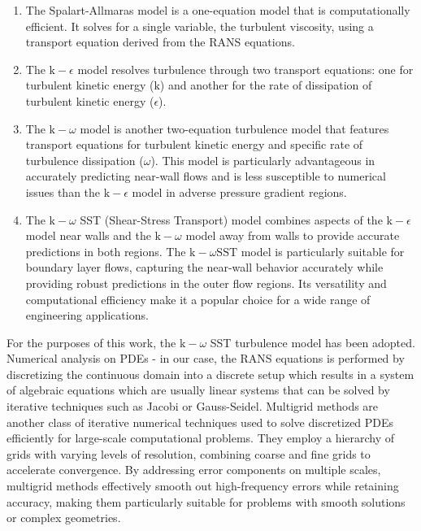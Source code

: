 \begin{enumerate}
  \item The Spalart-Allmaras model is a one-equation model that is computationally efficient. It solves for a single variable, the turbulent viscosity, using a transport equation derived from the RANS equations. 
  \item The $\text{k}-\epsilon$ model resolves turbulence through two transport equations: one for turbulent kinetic energy ($\text{k}$) and another for the rate of dissipation of turbulent kinetic energy ($\epsilon$). 
  \item The $\text{k}-\omega$ model is another two-equation turbulence model that features transport equations for turbulent kinetic energy and specific rate of turbulence dissipation ($\omega$). This model is particularly advantageous in accurately predicting near-wall flows and is less susceptible to numerical issues than the $\text{k}-\epsilon$ model in adverse pressure gradient regions. 
  \item The $\text{k}-\omega $  SST (Shear-Stress Transport) model combines aspects of the $\text{k}-\epsilon$ model near walls and the $\text{k}-\omega$ model away from walls to provide accurate predictions in both regions. The $\text{k}-\omega \text{SST}$ model is particularly suitable for boundary layer flows, capturing the near-wall behavior accurately while providing robust predictions in the outer flow regions. Its versatility and computational efficiency make it a popular choice for a wide range of engineering applications.
\end{enumerate}
For the purposes of this work, the $\text{k}-\omega$ SST turbulence model has been adopted.\\
Numerical analysis on PDEs - in our case, the RANS equations is performed by discretizing the continuous domain into a discrete setup which results in a system of algebraic equations which are usually linear systems that can be solved by iterative techniques such as Jacobi or Gauss-Seidel. Multigrid methods are another class of iterative numerical techniques used to solve discretized PDEs efficiently for large-scale computational problems. They employ a hierarchy of grids with varying levels of resolution, combining coarse and fine grids to accelerate convergence. By addressing error components on multiple scales, multigrid methods effectively smooth out high-frequency errors while retaining accuracy, making them particularly suitable for problems with smooth solutions or complex geometries. \\
